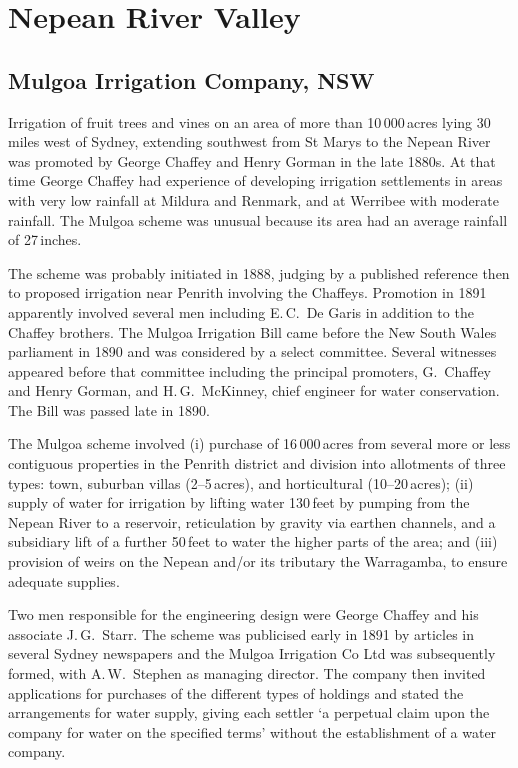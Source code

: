 \section*{Nepean River Valley}

\subsection*{Mulgoa Irrigation Company, NSW}

Irrigation of fruit trees and vines on an area of more than
10\,000\,acres lying 30 miles west of Sydney, extending southwest from
St Marys to the Nepean River was promoted by George Chaffey and Henry
Gorman in the late 1880s.  At that time George Chaffey had experience
of developing irrigation settlements in areas with very low rainfall
at Mildura and Renmark, and at Werribee with moderate rainfall.  The
Mulgoa scheme was unusual because its area had an average rainfall of
27\,inches.

The scheme was probably initiated in 1888, judging by a published
reference then to proposed irrigation near Penrith involving the
Chaffeys.  Promotion in 1891 apparently involved several men including
E.\,C.~De Garis in addition to the Chaffey brothers.  The Mulgoa
Irrigation Bill came before the New South Wales parliament in 1890 and
was considered by a select committee.  Several witnesses appeared
before that committee including the principal promoters, G.~Chaffey
and Henry Gorman, and H.\,G.~McKinney, chief engineer for water
conservation.  The Bill was passed late in 1890.

The Mulgoa scheme involved (i) purchase of 16\,000\,acres from several
more or less contiguous properties in the Penrith district and
division into allotments of three types: town, suburban villas
(2--5\,acres), and horticultural (10--20\,acres); (ii) supply of water
for irrigation by lifting water 130\,feet by pumping from the Nepean
River to a reservoir, reticulation by gravity via earthen channels,
and a subsidiary lift of a further 50\,feet to water the higher parts
of the area; and (iii) provision of weirs on the Nepean and/or its
tributary the Warragamba, to ensure adequate supplies.

Two men responsible for the engineering design were George Chaffey and
his associate J.\,G.~Starr.  The scheme was publicised early in 1891 by
articles in several Sydney newspapers and the Mulgoa Irrigation Co Ltd
was subsequently formed, with A.\,W.~Stephen as managing director.
The company then invited applications for purchases of the different
types of holdings and stated the arrangements for water supply, giving
each settler `a perpetual claim upon the company for water on the
specified terms' without the establishment of a water
company.


